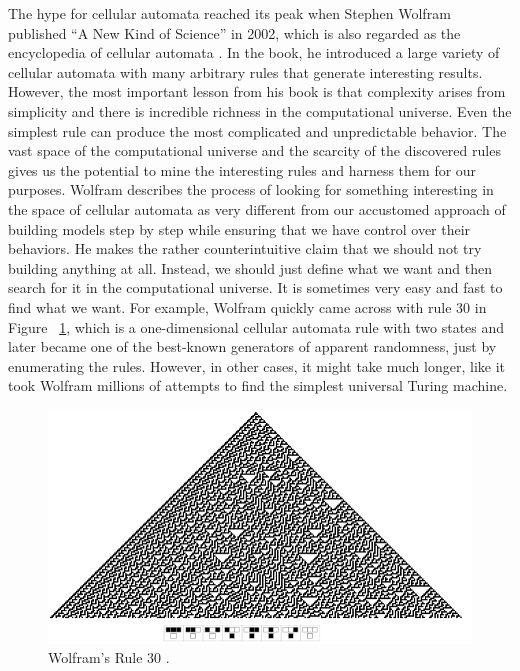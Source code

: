 \documentclass[12pt]{article}
\numberwithin{figure}{section} %
\begin{document}
The hype for cellular automata reached its peak when Stephen Wolfram published “A New Kind of Science” in 2002, which is also regarded as the encyclopedia of cellular automata \cite{A new kind of Science}. In the book, he introduced a large variety of cellular automata with many arbitrary rules that generate interesting results. However, the most important lesson from his book is that complexity arises from simplicity and there is incredible richness in the computational universe. Even the simplest rule can produce the most complicated and unpredictable behavior. The vast space of the computational universe and the scarcity of the discovered rules gives us the potential to mine the interesting rules and harness them for our purposes. Wolfram describes the process of looking for something interesting in the space of cellular automata as very different from our accustomed approach of building models step by step while ensuring that we have control over their behaviors. He makes the rather counterintuitive claim that we should not try building anything at all. Instead, we should just define what we want and then search for it in the computational universe. It is sometimes very easy and fast to find what we want. For example, Wolfram quickly came across with rule 30 \cite{Rule 30} in Figure ~\ref{fig:Rule 30}, which is a one-dimensional cellular automata rule with two states and later became one of the best-known generators of apparent randomness, just by enumerating the rules. However, in other cases, it might take much longer, like it took Wolfram millions of attempts to find the simplest universal Turing machine. 
 
\begin{figure}[H]
	\includegraphics[width=\linewidth]{Section2/1}
	\caption[Wolfram's rule 30]{Wolfram’s Rule 30 \cite{Rule 30}.}
	\vspace{-1.5em}
	\label{fig:Rule 30}
\end{figure}
\end{document}
